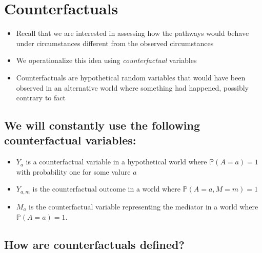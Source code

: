\documentclass[
  12pt,
]{book}
\providecommand{\tightlist}{%
  \setlength{\itemsep}{0pt}\setlength{\parskip}{0pt}}
\theoremstyle{definition}
\theoremstyle{definition}
\theoremstyle{definition}
\renewcommand{\P}{\mathbb{P}}
\newcommand{\1}{\mathbbm{1}}
\begin{document}
\hypertarget{counterfactuals}{%
\section{Counterfactuals}\label{counterfactuals}}

\begin{itemize}
\tightlist
\item
  Recall that we are interested in assessing how the pathways would behave under circumstances different from the observed circumstances
\item
  We operationalize this idea using \emph{counterfactual} variables
\item
  Counterfactuals are hypothetical random variables that would have been
  observed in an alternative world where something had happened, possibly
  contrary to fact 
\end{itemize}

\hypertarget{we-will-constantly-use-the-following-counterfactual-variables}{%
\subsection*{We will constantly use the following counterfactual variables:}\label{we-will-constantly-use-the-following-counterfactual-variables}}


\begin{itemize}
\tightlist
\item
  \(Y_a\) is a counterfactual variable in a hypothetical world where \(\P(A=a)=1\)
  with probability one for some valure \(a\)
\item
  \(Y_{a,m}\) is the counterfactual outcome in a world where \(\P(A=a,M=m)=1\)
\item
  \(M_a\) is the counterfactual variable representing the mediator in a world
  where \(\P(A=a)=1\).
\end{itemize}

\hypertarget{how-are-counterfactuals-defined}{%
\subsection{How are counterfactuals defined?}\label{how-are-counterfactuals-defined}}
\end{document}
